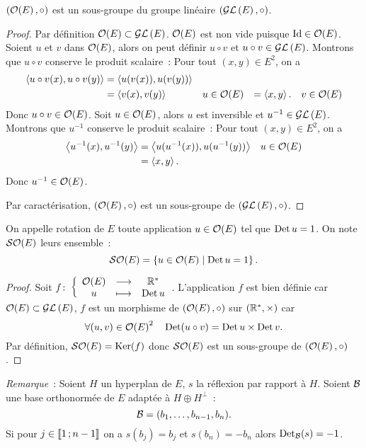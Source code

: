 \begin{theo}
  $(\mathcal{O}\!\left(E\right),\circ)$ est un sous-groupe du groupe linéaire $(\mathcal{GL}\left(E\right),\circ)$.
\end{theo}
\begin{proof}
  Par définition $\mathcal{O}\!\left(E\right) \subset \mathcal{GL}\left(E\right)$. $\mathcal{O}\!\left(E\right)$ est non vide puisque $\operatorname{Id} \in \mathcal{O}\!\left(E\right)$. Soient $u$ et $v$ dans $\mathcal{O}\!\left(E\right)$, alors on peut définir $u\circ v$ et $u \circ v \in \mathcal{GL}\left(E\right)$. Montrons que $u \circ v$ conserve le produit scalaire~: Pour tout $(x,y) \in E^2$, on a
  \begin{align}
    \left\langle{u\circ v(x)},{u\circ v(y)}\right\rangle &= \left\langle{u(v(x))},{u(v(y))}\right\rangle \\
    &=\left\langle{v(x)},{v(y)}\right\rangle && u \in \mathcal{O}\!\left(E\right)
    &=\left\langle{x},{y}\right\rangle. && v \in \mathcal{O}\!\left(E\right)
  \end{align}
  Donc $u \circ v \in \mathcal{O}\!\left(E\right)$. Soit $u \in \mathcal{O}\!\left(E\right)$, alors $u$ est inversible et $u^{-1} \in \mathcal{GL}\left(E\right)$. Montrons que $u^{-1}$ conserve le produit scalaire~: Pour tout $(x,y) \in E^2$, on a
  \begin{align}
    \left\langle{u^{-1}(x)},{u^{-1}(y)}\right\rangle&= \left\langle{u(u^{-1}(x))},{u(u^{-1}(y))}\right\rangle && u \in \mathcal{O}\!\left(E\right) \\
    &=\left\langle{x},{y}\right\rangle.
  \end{align}
  Donc $u^{-1} \in \mathcal{O}\!\left(E\right)$.

  Par caractérisation, $(\mathcal{O}\!\left(E\right), \circ)$ est un sous-groupe de $(\mathcal{GL}\left(E\right),\circ)$.
\end{proof}
%
\begin{defdef}
  On appelle rotation de $E$ toute application $u \in \mathcal{O}\!\left(E\right)$ tel que $\operatorname{Det} u=1$. On note $\mathcal{SO}\!\left(E\right)$ leurs ensemble~:
  \begin{equation}
    \mathcal{SO}\!\left(E\right)=\left\{u \in \mathcal{O}\!\left(E\right)\mathrel{}\middle|\mathrel{}\operatorname{Det} u=1\right\}.
  \end{equation}  
\end{defdef}
\begin{proof}
  Soit $f\colon \left\{\begin{array}{ccc} \mathcal{O}\!\left(E\right) & \longrightarrow &\mathbb{R}^*\\ u & \longmapsto & \operatorname{Det} u \end{array} \right.$. L'application $f$ est bien définie car $\mathcal{O}\!\left(E\right)\subset \mathcal{GL}\left(E\right)$, $f$ est un morphisme de $(\mathcal{O}\!\left(E\right), \circ)$ sur $(\mathbb{R}^*,\times)$ car
  \begin{equation}
    \forall (u,v) \in \mathcal{O}\!\left(E\right)^2 \quad \operatorname{Det}(u\circ v)= \operatorname{Det} u \times \operatorname{Det} v.
  \end{equation}
  Par définition, $\mathcal{SO}\!\left(E\right)=\operatorname{Ker}(f)$ donc $\mathcal{SO}\!\left(E\right)$ est un sous-groupe de $(\mathcal{O}\!\left(E\right), \circ)$.
\end{proof}

\emph{Remarque}~: Soient $H$ un hyperplan de $E$, $s$ la réflexion par rapport à $H$. Soient $\mathcal{B}$ une base orthonormée de $E$ adaptée à $H\oplus H^\perp$~:
\begin{equation}
  \mathcal{B}=(b_1, \dotsc, b_{n-1}, b_n).
\end{equation}
Si pour $j \in \mathopen{\llbracket}1\mathclose{}\mathpunct{};n-1\mathclose{\rrbracket}$ on a $s(b_j)=b_j$ et $s(b_n)=-b_n$ alors $\operatorname{Det}_{\mathcal{B}}(s)=-1$.

